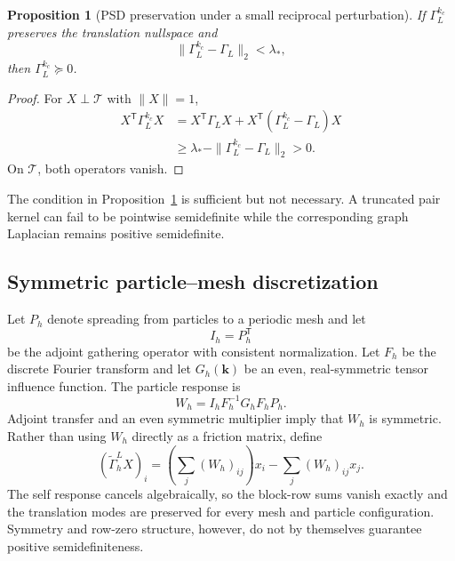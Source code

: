 \documentclass[11pt]{article}
\theoremstyle{plain}
\newtheorem{proposition}{Proposition}[section]
\newcommand{\kk}{\bm k}
\newcommand{\cT}{\mathcal{T}}
\DeclareRobustCommand{\_}{\textunderscore\allowbreak}
\begin{document}
\begin{proposition}[PSD preservation under a small reciprocal perturbation]
\label{prop:psd-trunc}
If $\Gamma_L^{k_c}$ preserves the translation nullspace and
\begin{equation}
\|\Gamma_L^{k_c}-\Gamma_L\|_2<\lambda_*,
\end{equation}
then $\Gamma_L^{k_c}\succeq0$.
\end{proposition}

\begin{proof}
For $X\perp\cT$ with $\|X\|=1$,
\begin{align}
X^{\mathsf T}\Gamma_L^{k_c}X
&=
X^{\mathsf T}\Gamma_LX
+
X^{\mathsf T}(\Gamma_L^{k_c}-\Gamma_L)X
\\
&\ge
\lambda_*
-
\|\Gamma_L^{k_c}-\Gamma_L\|_2
>0.
\end{align}
On $\cT$, both operators vanish.
\end{proof}

The condition in Proposition~\ref{prop:psd-trunc} is sufficient but not
necessary. A truncated pair kernel
can fail to be pointwise semidefinite while the corresponding graph
Laplacian remains positive semidefinite.

\subsection{Symmetric particle--mesh discretization}

Let $P_h$ denote spreading from particles to a periodic mesh and let
\begin{equation}
I_h=P_h^{\mathsf T}
\end{equation}
be the adjoint gathering operator with consistent normalization. Let $F_h$
be the discrete Fourier transform and let $G_h(\kk)$ be an even,
real-symmetric tensor influence function. The particle response is
\begin{equation}
W_h
=
I_hF_h^{-1}G_hF_hP_h.
\end{equation}
Adjoint transfer and an even symmetric multiplier imply that $W_h$ is
symmetric. Rather than using $W_h$ directly as a friction matrix, define
\begin{equation}
\label{eq:pm-graph}
(\widetilde\Gamma_h^LX)_i
=
\left(\sum_j(W_h)_{ij}\right)x_i
-
\sum_j(W_h)_{ij}x_j.
\end{equation}
The self response cancels algebraically, so the block-row sums vanish
exactly and the translation modes are preserved for every mesh and particle
configuration. Symmetry and row-zero structure, however, do not by
themselves guarantee positive semidefiniteness.
\end{document}
